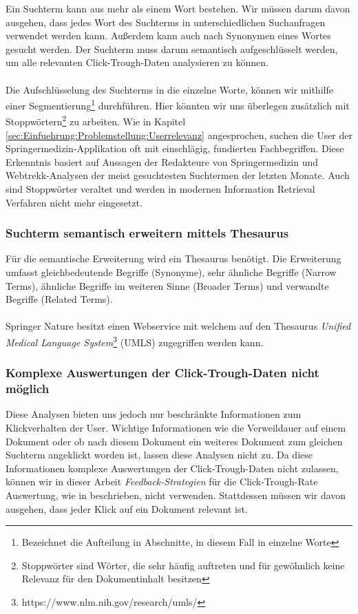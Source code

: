Ein Suchterm kann aus mehr als einem Wort bestehen. Wir müssen darum davon ausgehen, dass jedes Wort des Suchterms in unterschiedlichen Suchanfragen verwendet werden kann. Außerdem kann auch nach Synonymen eines Wortes gesucht werden. Der Suchterm muss darum semantisch aufgeschlüsselt werden, um alle relevanten Click-Trough-Daten analysieren zu können. 
\\
\\
Die Aufschlüsselung des Suchterms in die einzelne Worte, können wir mithilfe einer Segmentierung\footnote{Bezeichnet die Aufteilung in Abschnitte, in diesem Fall in einzelne Worte} durchführen. Hier könnten wir uns überlegen zusätzlich mit Stoppwörtern\footnote{Stoppwörter sind Wörter, die sehr häufig auftreten und für gewöhnlich keine Relevanz für den Dokumentinhalt besitzen} zu arbeiten. 
Wie in Kapitel \ref{sec:Einfuehrung:Problemstellung:Userrelevanz} angesprochen, suchen die User der Springermedizin-Applikation oft mit einschlägig, fundierten Fachbegriffen. Diese Erkenntnis basiert auf Aussagen der Redakteure von Springermedizin und Webtrekk-Analysen der meist gesuchtesten Suchtermen der letzten Monate. Auch sind Stoppwörter veraltet und werden in modernen Information Retrieval Verfahren nicht mehr eingesetzt.

\subsubsection{Suchterm semantisch erweitern mittels Thesaurus}
\label{sec:Einfuehrung:Methodik:Click-Trough-Daten:SuchtermThesaurus}

Für die semantische Erweiterung wird ein Thesaurus benötigt. Die Erweiterung umfasst gleichbedeutende Begriffe (Synonyme), sehr ähnliche Begriffe (Narrow Terms), ähnliche Begriffe im weiteren Sinne (Broader Terms) und verwandte Begriffe (Related Terms).
\\
\\
Springer Nature besitzt einen Webservice mit welchem auf den Thesaurus \textit{Unified Medical Language System}\footnote{https://www.nlm.nih.gov/research/umls/} (UMLS) zugegriffen werden kann. 

\subsubsection{Komplexe Auswertungen der Click-Trough-Daten nicht möglich}
\label{sec:Einfuehrung:Methodik:Click-Trough-Daten:Click-Trough-DatenAuswertungen}

Diese Analysen bieten uns jedoch nur beschränkte Informationen zum Klickverhalten der User. Wichtige Informationen wie die Verweildauer auf einem Dokument oder ob nach diesem Dokument ein weiteres Dokument zum gleichen Suchterm angeklickt worden ist, lassen diese Analysen nicht zu. Da diese Informationen komplexe Auswertungen der Click-Trough-Daten nicht zulassen, können wir in dieser Arbeit \textit{Feedback-Strategien} für die Click-Trough-Rate Auswertung, wie in \cite{Joachims} beschrieben, nicht verwenden. Stattdessen müssen wir davon ausgehen, dass jeder Klick auf ein Dokument relevant ist.

